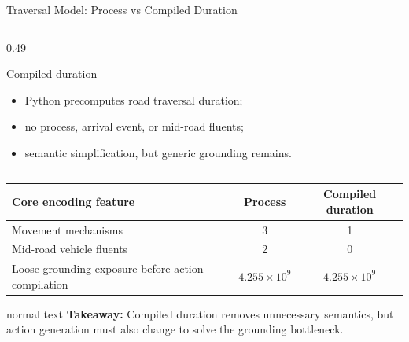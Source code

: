 \documentclass[10pt,aspectratio=169]{beamer}
\newcommand{\takeaway}[1]{%
  \begin{beamercolorbox}[rounded=true,sep=0.65ex,wd=\linewidth]{normal text}%
    \textbf{Takeaway:} #1
  \end{beamercolorbox}%
}
\begin{document}
\begin{frame}{Traversal Model: Process vs Compiled Duration}
\begin{columns}[T,onlytextwidth]
\begin{column}{0.49\textwidth}
\begin{beamerboxesrounded}[upper=block title,lower=block body,shadow=true]{Compiled duration}
        \vspace{0.22cm}
        \scriptsize
        \begin{itemize}
          \item Python precomputes road traversal duration;
          \item no process, arrival event, or mid-road fluents;
          \item semantic simplification, but generic grounding remains.
        \end{itemize}
      \end{beamerboxesrounded}
    \end{column}
  \end{columns}

  \vspace{0.30cm}
  \centering\scriptsize
  \begin{tabular}{@{}lcc@{}}
    \toprule
    Core encoding feature & Process & Compiled duration \\
    \midrule
    Movement mechanisms & 3 & 1 \\
    Mid-road vehicle fluents & 2 & 0 \\
    Loose grounding exposure before action compilation & $4.255\times10^9$ & $4.255\times10^9$ \\
    \bottomrule
  \end{tabular}

  \vspace{0.20cm}
  \takeaway{Compiled duration removes unnecessary semantics, but action generation must also change to solve the grounding bottleneck.}
\end{frame}
\end{document}
